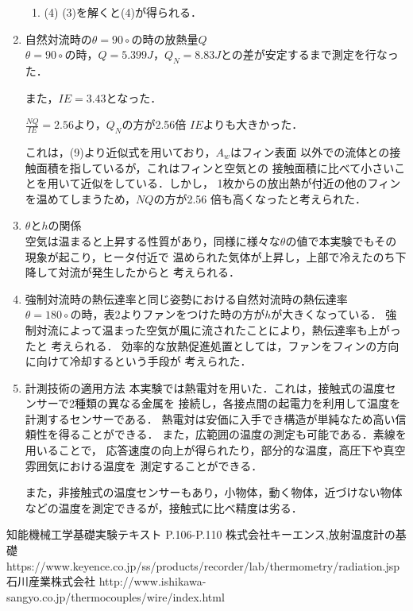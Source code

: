 \documentclass[twocolumn, 10pt,a4j]{jsarticle}
\begin{document}
\begin{enumerate}
\begin{enumerate}
      \item (4)
        (3)を解くと(4)が得られる．
    \end{enumerate}
  
  \item 自然対流時の$\theta = 90 \circ$の時の放熱量$Q$ \\
    $\theta = 90 \circ$の時，$Q = 5.399J$，$Q_{N} = 8.83J$との差が安定するまで測定を行なった．
    \par また，$IE = 3.43$となった．
    \par $\frac{NQ}{IE} = 2.56$より，$Q_{N}$の方が2.56倍
    $IE$よりも大きかった．
    \par これは，(9)より近似式を用いており，$A_{w}$はフィン表面
    以外での流体との接触面積を指しているが，これはフィンと空気との
    接触面積に比べて小さいことを用いて近似をしている．しかし，
    1枚からの放出熱が付近の他のフィンを温めてしまうため，$NQ$の方が2.56
    倍も高くなったと考えられた．
  \item $\theta$と$h$の関係 \\
    空気は温まると上昇する性質があり，同様に様々な$\theta$の値で本実験でもその現象が起こり，ヒータ付近で
    温められた気体が上昇し，上部で冷えたのち下降して対流が発生したからと
    考えられる．
  \item 強制対流時の熱伝達率と同じ姿勢における自然対流時の熱伝達率 \\
    $\theta = 180 \circ$の時，表2よりファンをつけた時の方が$h$が大きくなっている．
    強制対流によって温まった空気が風に流されたことにより，熱伝達率も上がったと
    考えられる．
    効率的な放熱促進処置としては，ファンをフィンの方向に向けて冷却するという手段が
    考えられた．
  \item 計測技術の適用方法
    本実験では熱電対を用いた．これは，接触式の温度センサーで2種類の異なる金属を
    接続し，各接点間の起電力を利用して温度を計測するセンサーである．
    熱電対は安価に入手でき構造が単純なため高い信頼性を得ることができる．
    また，広範囲の温度の測定も可能である．素線を用いることで，
    応答速度の向上が得られたり，部分的な温度，高圧下や真空雰囲気における温度を
    測定することができる．
    \par また，非接触式の温度センサーもあり，小物体，動く物体，近づけない物体
    などの温度を測定できるが，接触式に比べ精度は劣る．
    
\end{enumerate}

\begin{thebibliography}{1}
  \bibitem{}知能機械工学基礎実験テキスト P.106-P.110
  \bibitem{}株式会社キーエンス,放射温度計の基礎 https://www.keyence.co.jp/ss/products/recorder/lab/thermometry/radiation.jsp
  \bibitem{}石川産業株式会社 http://www.ishikawa-sangyo.co.jp/thermocouples/wire/index.html
\end{thebibliography}
\end{document}
